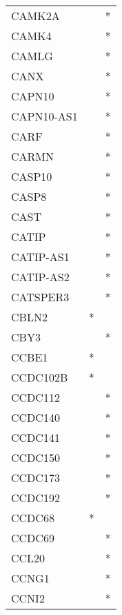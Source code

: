 \begin{longtable}{lcc}
CAMK2A          &                &          * \\
CAMK4           &                &          * \\
CAMLG           &                &          * \\
CANX            &                &          * \\
CAPN10          &                &          * \\
CAPN10-AS1      &                &          * \\
CARF            &                &          * \\
CARMN           &                &          * \\
CASP10          &                &          * \\
CASP8           &                &          * \\
CAST            &                &          * \\
CATIP           &                &          * \\
CATIP-AS1       &                &          * \\
CATIP-AS2       &                &          * \\
CATSPER3        &                &          * \\
CBLN2           &              * &            \\
CBY3            &                &          * \\
CCBE1           &              * &            \\
CCDC102B        &              * &            \\
CCDC112         &                &          * \\
CCDC140         &                &          * \\
CCDC141         &                &          * \\
CCDC150         &                &          * \\
CCDC173         &                &          * \\
CCDC192         &                &          * \\
CCDC68          &              * &            \\
CCDC69          &                &          * \\
CCL20           &                &          * \\
CCNG1           &                &          * \\
CCNI2           &                &          * \\

\end{longtable}
